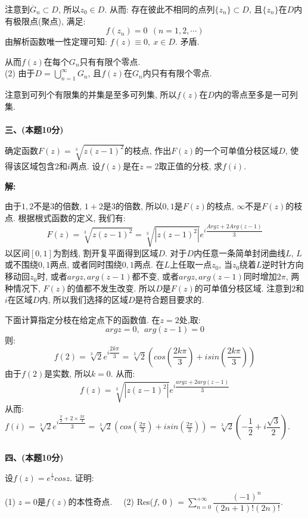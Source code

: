 \documentclass{article}
\begin{document}
注意到$\overline{G}_n \subset D$, 所以$z_0 \in D$. 从而: 存在彼此不相同的点列$\{ z_n \} \subset D$, 且$\{z_n\}$在$D$内有极限点(聚点), 满足:
$$ f(z_n) = 0 \ \ (n=1,2,\cdots)$$
由解析函数唯一性定理可知: $f(z) \equiv 0, \ x \in D $. 矛盾. 

从而$f(z)$在每个$G_n$只有有限个零点. \\

(2) 由于$D =\bigcup\limits_{n=1}^{\infty} G_n$, 且$f(z)$在$G_n$内只有有限个零点.

注意到可列个有限集的并集是至多可列集, 所以$f(z)$在$D$内的零点至多是一可列集.  \\  \\

\textbf{三、(本题10分)}

确定函数$F(z) = \sqrt[3]{z(z-1)^2}$的枝点, 作出$F(z)$的一个可单值分枝区域$D$, 使得该区域包含$2$和$i$两点. 设$f(z)$是在$z=2$取正值的分枝, 求$f(i)$. 

\textbf{解:}

由于$1,2$不是$3$的倍数, $1+2$是$3$的倍数, 所以$0,1$是$F(z)$的枝点, $\infty$不是$F(z)$的枝点. 根据根式函数的定义, 我们有:
$$ F(z) = \sqrt[3]{z(z-1)^2} = \sqrt[3]{|z(z-1)^2|}e^{i\dfrac{Argz + 2Arg(z-1)}{3}} $$
以区间$[0,1]$为割线, 割开复平面得到区域$D$. 对于$D$内任意一条简单封闭曲线$L$, $L$或不围绕$0, 1$两点, 或者同时围绕$0,1$两点. 在$L$上任取一点$z_0$, 当$z_0$绕着$L$逆时针方向移动回$z_0$时, 或者$argz, arg(z-1)$都不变, 或者$argz, arg(z-1)$同时增加$2\pi$, 两种情况下, $F(z)$的值都不发生改变. 所以$D$是$F(z)$的可单值分枝区域. 注意到$2$和$i$在区域$D$内, 所以我们选择的区域$D$是符合题目要求的. 

下面计算指定分枝在给定点下的函数值. 在$z=2$处,取:
$$ argz = 0, \ \ arg(z-1) = 0 $$
则:
$$ f(2) = \sqrt[3]{2}e^{i\dfrac{2k\pi}{3}} = \sqrt[3]{2}\left( cos(\frac{2k\pi}{3}) + isin(\frac{2k\pi}{3}) \right) $$ 
由于$f(2)$是实数, 所以$k=0$. 从而:
$$ f(z) = \sqrt[3]{|z(z-1)^2|}e^{i\dfrac{argz + 2arg(z-1)}{3}}  $$
从而:$f(i) = \sqrt[3]{2} e^{i\dfrac{\frac{\pi}{2} + 2\times \frac{3\pi}{4}}{3}} =  \sqrt[3]{2}\left( cos(\frac{2\pi}{3}) + isin(\frac{2\pi}{3}) \right) = \sqrt[3]{2}(-\dfrac{1}{2} + i\dfrac{\sqrt{3}}{2}) $.\\ \\


\textbf{四、(本题10分)}

设$f(z) = e^{\frac{1}{z}}cosz$. 证明:

(1) $z=0$是$f(z)$的本性奇点. \ \ (2) Res($f$, $0$ ) $ = \sum\limits_{n=0}^{+\infty} \dfrac{(-1)^n}{(2n+1)!(2n)!}$. 
\end{document}
